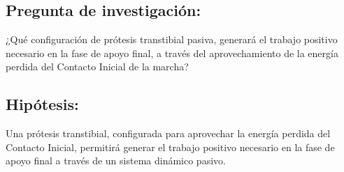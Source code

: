 \documentclass[12pt,english]{article}
\begin{document}
\subsection*{Pregunta de investigación: }

¿Qué configuración de prótesis transtibial pasiva, generará el trabajo
positivo necesario en la fase de apoyo final, a través del aprovechamiento
de la energía perdida del Contacto Inicial de la marcha?


\subsection*{Hipótesis:}

Una prótesis transtibial, configurada para aprovechar la energía perdida
del Contacto Inicial, permitirá generar el trabajo positivo necesario
en la fase de apoyo final a través de un sistema dinámico pasivo.
\end{document}
